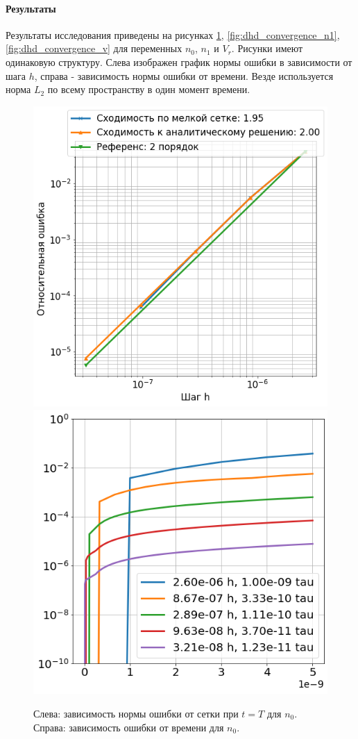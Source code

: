 \paragraph{Результаты}
Результаты исследования приведены на рисунках \ref{fig:dhd_convergence_n0}, \ref{fig:dhd_convergence_n1}, \ref{fig:dhd_convergence_v} для переменных $n_0$, $n_1$ и $V_r$. Рисунки имеют одинаковую структуру. Слева изображен график нормы ошибки в зависимости от шага $h$, справа - зависимость нормы ошибки от времени. Везде используется норма $L_2$ по всему пространству в один момент времени.
\begin{figure}[H]
\centering
\includegraphics[width=.5\textwidth]{dhd_convergence/convergence_n0.png}\hfill
\includegraphics[width=.5\textwidth]{dhd_convergence/time_error_n0.png}
\caption{Слева: зависимость нормы ошибки от сетки при $t = T$ для $n_0$. Справа: зависимость ошибки от времени для $n_0$.}
\label{fig:dhd_convergence_n0}
\end{figure}

